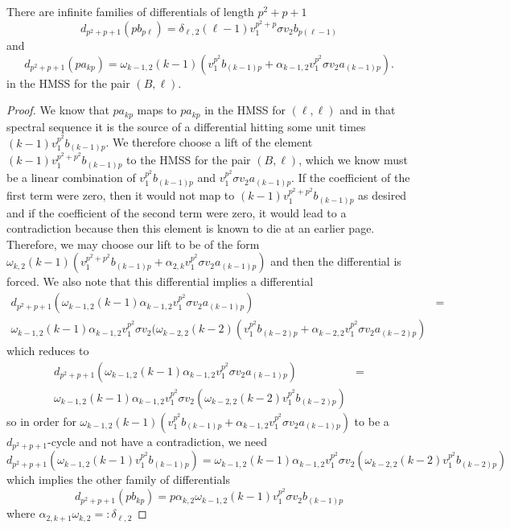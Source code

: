\begin{lem}
There are infinite families of differentials of length $p^2+p+1$
\[ 
	d_{p^2+p+1}(pb_{p\ell})=\delta_{\ell,2}(\ell-1) v_1^{p^2+p}\sigma v_2b_{p(\ell-1)}
	\]
and 
\[
	d_{p^2+p+1}(pa_{kp}) = \omega_{k-1,2} (k-1)\left ( v_1^{p^2} b_{(k-1)p}+\alpha_{k-1,2}v_1^{p^2}\sigma v_2a_{(k-1)p}\right ).
\]
in the HMSS for the pair $(B,\ell)$. 
\end{lem}
\begin{proof}
We know that $pa_{kp}$ maps to $pa_{kp}$ in the HMSS for $(\ell,\ell)$ and in that spectral sequence it is the source of a differential hitting some unit times 
$(k-1)v_1^{p^2} b_{(k-1)p}$. 
We therefore choose a lift of the element $(k-1)v_1^{p^2 +p^2} b_{(k-1)p}$
to the HMSS for the pair $(B,\ell)$, which we know must be a linear combination of 
$v_1^{p^2} b_{(k-1)p}$ and $v_1^{p^2}\sigma v_2a_{(k-1)p}$. 
If the coefficient of the first term were zero, then it would not map to $(k-1)v_1^{p^2 +p^2} b_{(k-1)p}$ as desired and if the coefficient of the second term were zero, it would lead to a contradiction because then this element is known to die at an earlier page. 
Therefore, we may choose our lift to be of the form $\omega_{k,2} (k-1)\left ( v_1^{p^2 +p^2} b_{(k-1)p}+\alpha_{2,k}v_1^{p^2}\sigma v_2a_{(k-1)p}\right )$ and then the differential is forced. 
We also note that this differential implies a differential 
\begin{align*}
d_{p^2+p+1}(\omega_{k-1,2} (k-1) \alpha_{k-1,2}v_1^{p^2}\sigma v_2a_{(k-1)p})& =\\
\omega_{k-1,2} (k-1) \alpha_{k-1,2}v_1^{p^2}\sigma v_2 ( \omega_{k-2,2} (k-2)\left ( v_1^{p^2} b_{(k-2)p}+\alpha_{k-2,2}v_1^{p^2}\sigma v_2a_{(k-2)p}\right )
\end{align*}
which reduces to 
\begin{align*}
d_{p^2+p+1}(\omega_{k-1,2} (k-1) \alpha_{k-1,2}v_1^{p^2}\sigma v_2a_{(k-1)p})&= \\
\omega_{k-1,2} (k-1) \alpha_{k-1,2}v_1^{p^2}\sigma v_2( \omega_{k-2,2} (k-2)v_1^{p^2} b_{(k-2)p})&
\end{align*}
so in order for $\omega_{k-1,2} (k-1)\left ( v_1^{p^2} b_{(k-1)p}+\alpha_{k-1,2}v_1^{p^2}\sigma v_2a_{(k-1)p}\right )$ to be a $d_{p^2+p+1}$-cycle and not have a contradiction, we need 
\[ d_{p^2+p+1}(\omega_{k-1,2} (k-1) v_1^{p^2 } b_{(k-1)p})= \omega_{k-1,2} (k-1) \alpha_{k-1,2}v_1^{p^2}\sigma v_2( \omega_{k-2,2} (k-2) v_1^{p^2} b_{(k-2)p})\]
which implies the other family of differentials
\[ d_{p^2+p+1}(pb_{kp})=p\alpha_{k,2}\omega_{k-1,2} (k-1)v_1^{p^2}\sigma v_2 b_{(k-1)p}\]
where $\alpha_{2,k+1}\omega_{k,2}=:\delta_{\ell,2}$
\end{proof}
